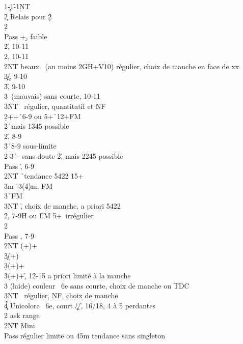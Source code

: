 \documentclass[a4paper]{article}
\begin{document}
\begin{bidtable}
1\c-1\h-1NT\+\\
2\c \> Relais pour 2\d \+\\
2\d\+\\
Pass +\d , faible\\
2\h {}\h , 10-11\\
2\s {}\s , 10-11\\
2NT  beaux \s\ (au moins 2GH+V10) régulier, choix de manche en face de xx\\
3\c\d {}\c /\d , 9-10\\
3\h {}\h , 9-10\\
3\s {}\s\ (mauvais) sans courte, 10-11\\
3NT \s\ régulier, quantitatif et NF\-\-\\
2\d {}++\h\ 6-9 ou 5+\h\ 12+FM\+\\
2\h {}\h\ mais 1345 possible\+\\
2\s {}\h , 8-9\\
3\h {}\h\ 8-9 sous-limite\-\\
2\s {}-3\h\ - sans doute 2\h , mais 2245 possible\+\\
Pass \h , 6-9\\
2NT \h\ tendance 5422 15+\\
3m \h -3(4)m, FM\\
3\s {}\h\ FM\\
3NT \h , choix de manche, a priori 5422\-\-\\
2\h {}\s , 7-9H ou FM 5+\s\ irrégulier\+\\
2\s\+\\
Pass \s , 7-9\\
2NT (+)+\c \\
3\c {}(+)\d \\
3\d {}(+)+\d \\
3\h {}(+)+\h , 12-15 a priori limité à la manche\\
3\s \> (laide) couleur \s\ 6e sans courte, choix de manche ou TDC\\
3NT \s\ régulier, NF, choix de manche\\
4\c\d\h \> Unicolore \s\ 6e, court \c /\d /\h , 16/18, 4 à 5 perdantes\-\-\\
2\s \> ask range\+\\
2NT \> Mini\+\\
Pass \> régulier limite ou 4\s 5m tendance sans singleton\\

\end{bidtable}
\end{document}
